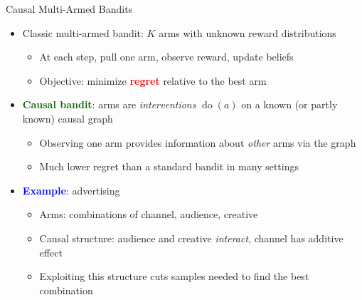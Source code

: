 \documentclass[
  10pt,
  ignorenonframetext,
]{beamer}
\providecommand{\tightlist}{%
  \setlength{\itemsep}{0pt}\setlength{\parskip}{0pt}}
\begin{document}
\begin{frame}{Causal Multi-Armed Bandits}
\label{causal-multi-armed-bandits}
\begin{itemize}
\tightlist
\item
  Classic multi-armed bandit: \(K\) arms with unknown reward
  distributions

  \begin{itemize}
  \tightlist
  \item
    At each step, pull one arm, observe reward, update beliefs
  \item
    Objective: minimize \textbf{\textcolor{red}{regret}} relative to the
    best arm
  \end{itemize}
\item
  \textbf{\textcolor{darkgreen}{Causal bandit}}: arms are
  \emph{interventions} \(\operatorname{do}(a)\) on a known (or partly
  known) causal graph

  \begin{itemize}
  \tightlist
  \item
    Observing one arm provides information about \emph{other} arms via
    the graph
  \item
    Much lower regret than a standard bandit in many settings
  \end{itemize}
\item
  \textbf{\textcolor{blue}{Example}}: advertising

  \begin{itemize}
  \tightlist
  \item
    Arms: combinations of channel, audience, creative
  \item
    Causal structure: audience and creative \emph{interact}, channel has
    additive effect
  \item
    Exploiting this structure cuts samples needed to find the best
    combination
  \end{itemize}
\end{itemize}
\end{frame}
\end{document}

